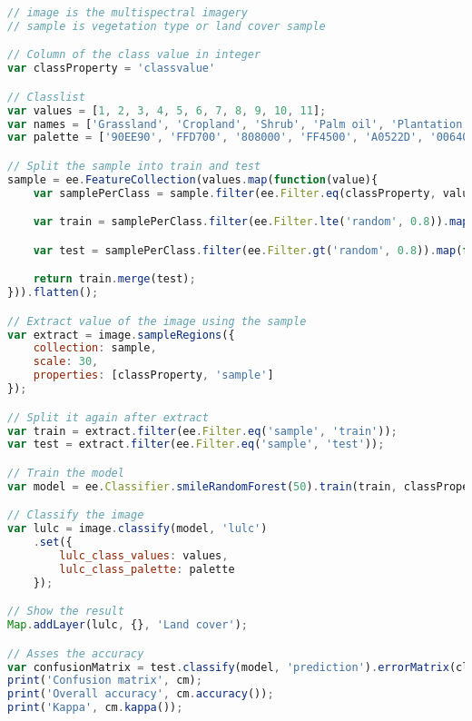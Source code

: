 \begin{lstlisting}[language=JavaScript, label={code:machineLearning}, caption={GEE Script to Classify Vegetation Type using Machine Learning}]
// image is the multispectral imagery
// sample is vegetation type or land cover sample

// Column of the class value in integer
var classProperty = 'classvalue'

// Classlist
var values = [1, 2, 3, 4, 5, 6, 7, 8, 9, 10, 11];
var names = ['Grassland', 'Cropland', 'Shrub', 'Palm oil', 'Plantation forest', 'Natural forest', 'Wetland', 'Ricefield', 'Built-up', 'Bareland', 'Water'];
var palette = ['90EE90', 'FFD700', '808000', 'FF4500', 'A0522D', '006400', '40E0D0', '008080', 'F08080', 'DEB887', '87CEFA'];

// Split the sample into train and test
sample = ee.FeatureCollection(values.map(function(value){
	var samplePerClass = sample.filter(ee.Filter.eq(classProperty, value)).randomColumn(); // Add random value column to the sample

	var train = samplePerClass.filter(ee.Filter.lte('random', 0.8)).map(function(feat){ return feat.set('sample', 'train')});

	var test = samplePerClass.filter(ee.Filter.gt('random', 0.8)).map(function(feat){ return feat.set('sample', 'test')});;

	return train.merge(test);
})).flatten();

// Extract value of the image using the sample
var extract = image.sampleRegions({
	collection: sample,
	scale: 30,
	properties: [classProperty, 'sample']
});

// Split it again after extract
var train = extract.filter(ee.Filter.eq('sample', 'train'));
var test = extract.filter(ee.Filter.eq('sample', 'test'));

// Train the model
var model = ee.Classifier.smileRandomForest(50).train(train, classProperty, image.bandNames());

// Classify the image
var lulc = image.classify(model, 'lulc')
	.set({
		lulc_class_values: values,
		lulc_class_palette: palette
	});

// Show the result
Map.addLayer(lulc, {}, 'Land cover');

// Asses the accuracy
var confusionMatrix = test.classify(model, 'prediction').errorMatrix(classProperty, 'prediction');
print('Confusion matrix', cm);
print('Overall accuracy', cm.accuracy());
print('Kappa', cm.kappa());
\end{lstlisting}

